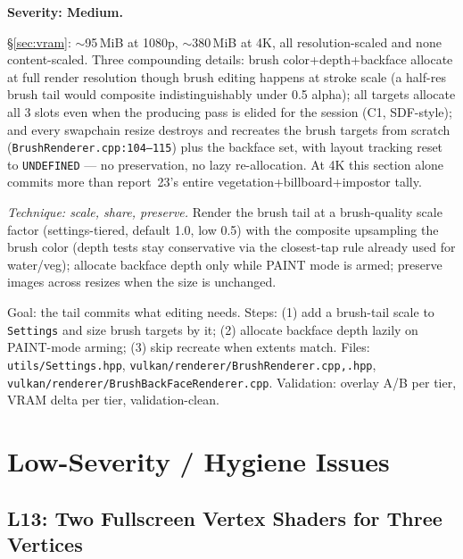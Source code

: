\documentclass[11pt,a4paper]{article}
\begin{document}
\textbf{Severity: Medium.}

\S\ref{sec:vram}: $\sim$95\,MiB at 1080p, $\sim$380\,MiB at 4K, all
resolution-scaled and none content-scaled. Three compounding details: brush
color+depth+backface allocate at full render resolution though brush editing
happens at stroke scale (a half-res brush tail would composite indistinguishably
under 0.5 alpha); all targets allocate all 3 slots even when the producing
pass is elided for the session (C1, SDF-style); and every swapchain resize
destroys and recreates the brush targets from scratch
(\texttt{BrushRenderer.cpp:104--115}) plus the backface set, with layout
tracking reset to \texttt{UNDEFINED} --- no preservation, no lazy
re-allocation. At 4K this section alone commits more than report~23's entire
vegetation+billboard+impostor tally.

\textit{Technique: scale, share, preserve.} Render the brush tail at a
brush-quality scale factor (settings-tiered, default 1.0, low 0.5) with the
composite upsampling the brush color (depth tests stay conservative via the
closest-tap rule already used for water/veg); allocate backface depth only
while PAINT mode is armed; preserve images across resizes when the size is
unchanged.

\begin{tcolorbox}[promptbox={Prompt --- M12: scaled, lazy tail targets}]
Goal: the tail commits what editing needs. Steps: (1) add a brush-tail scale
to \texttt{Settings} and size brush targets by it; (2) allocate backface
depth lazily on PAINT-mode arming; (3) skip recreate when extents match.
Files: \texttt{utils/Settings.hpp},
\texttt{vulkan/renderer/BrushRenderer.cpp,.hpp},
\texttt{vulkan/renderer/BrushBackFaceRenderer.cpp}. Validation: overlay A/B
per tier, VRAM delta per tier, validation-clean.
\end{tcolorbox}

\section{Low-Severity / Hygiene Issues}

\subsection{L13: Two Fullscreen Vertex Shaders for Three Vertices}
\end{document}
